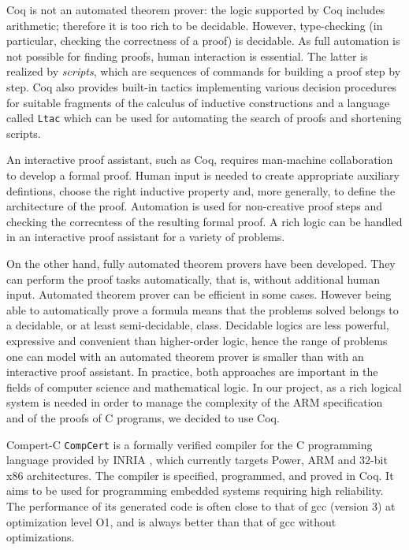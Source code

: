 \documentclass[twocolumn]{article}
\makeatletter
\def\subsection{\@startsection {subsection}{2}{\z@}{16pt plus 2pt minus 2pt}
{6pt plus 2pt minus 2pt}{\normalsize\sl
\edef\@svsec{\thesubsection.\ }}}
\def\thesubsection{\Alph{subsection}}
\newcommand{\compcert}{\texttt{CompCert}\xspace}
\makeatother
\begin{document}
Coq is not an automated theorem prover: the logic supported by Coq
includes arithmetic; therefore it is too rich to be decidable.
However, type-checking (in particular, checking the correctness of a
proof) is decidable.  As full automation is not possible for finding
proofs, human interaction is essential.  The latter is realized by
\emph{scripts}, which are sequences of commands for building a proof
step by step.  Coq also provides built-in tactics implementing various
decision procedures for suitable fragments of the calculus of
inductive constructions and a language called \texttt{Ltac} which can
be used for automating the search of proofs and shortening scripts.

An interactive proof assistant, such as Coq, requires man-machine
collaboration to develop a formal proof.  Human input is needed to
create appropriate auxiliary defintions, choose the right inductive
property and, more generally, to define the architecture of the proof.
Automation is used for non-creative proof steps and checking the
correcntess of the resulting formal proof.  A rich logic can be
handled in an interactive proof assistant for a variety of problems.

On the other hand, fully automated theorem provers have been
developed.  They can perform the proof tasks automatically, that is,
without additional human input.  Automated theorem prover can be
efficient in some cases.  However being able to automatically prove a
formula means that the problems solved belongs to a decidable, or at
least semi-decidable, class. Decidable logics are less powerful,
expressive and convenient than higher-order logic, hence the range of
problems one can model with an automated theorem prover is smaller
than with an interactive proof assistant.  In practice, both
approaches are important in the fields of computer science and
mathematical logic.  In our project, as a rich logical system is
needed in order to manage the complexity of the ARM specification and
of the proofs of C programs, we decided to use Coq.

\subsection{Compert-C}
\compcert is a formally verified compiler for the C programming
language provided by INRIA \cite{ccc, Leroy-Compcert-CACM}, which
currently targets Power, ARM and 32-bit x86 architectures.  The
compiler is specified, programmed, and proved in Coq. It aims to be
used for programming embedded systems requiring high reliability. The
performance of its generated code is often close to that of gcc
(version 3) at optimization level O1, and is always better than that
of gcc without optimizations.
\end{document}
